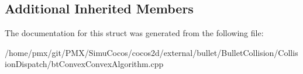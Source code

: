 \subsection*{Additional Inherited Members}


The documentation for this struct was generated from the following file\+:\begin{DoxyCompactItemize}
\item 
/home/pmx/git/\+P\+M\+X/\+Simu\+Cocos/cocos2d/external/bullet/\+Bullet\+Collision/\+Collision\+Dispatch/bt\+Convex\+Convex\+Algorithm.\+cpp\end{DoxyCompactItemize}
